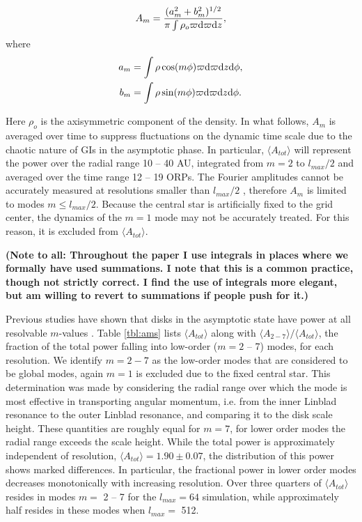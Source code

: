 \documentclass[manuscript]{aastex}
\begin{document}
\begin{equation}
A_m = \frac{(a_m^2 + b_m^2)^{1/2}}{\pi\int\rho_o \varpi {\rm d}\varpi {\rm d}z},
\end{equation}
where
\begin{subequations}
\begin{align}
a_m &= \int \rho \cos(m\phi)\varpi {\rm d}\varpi {\rm d}z {\rm d}\phi,\\
b_m &=\int \rho \sin(m\phi)\varpi {\rm d}\varpi {\rm d}z {\rm d}\phi.
\end{align}
\end{subequations}


Here  $\rho_o$ is the axisymmetric component of the density. In what follows, $A_m$ is averaged over time to suppress fluctuations on the dynamic time scale due to the chaotic nature of GIs in the asymptotic  phase.
In particular, $\langle A_{tot} \rangle$ will represent the power over the radial range 10 -- 40 AU, integrated from $ m = 2$ to $l_{max}/2$ and averaged over the time range 12 -- 19 ORPs. The Fourier amplitudes cannot be accurately measured at resolutions smaller than $l_{max}/2$ \citep{shannon1984}, therefore $A_m$ is limited to modes $m \le l_{max}/2$.  
Because the central star is artificially fixed to the grid center, the dynamics of the $m=1$ mode may not
be accurately treated. For this reason, it is excluded from $\langle A_{tot} \rangle$.

{\bf (Note to all: Throughout the paper I use integrals in places where we 
formally have used summations.  I note that this is a common practice, though
not strictly correct.  I find the use of integrals more elegant, but am willing to
revert to summations if people push for it.)}

Previous studies have shown that disks in the asymptotic state have power at all resolvable $m$-values  \citep{lodato2004,mejia2005,boley2006,cossins2009}.  Table \ref{tbl:ams} lists $\langle A_{tot} \rangle$ along with $\langle A_{2-7} \rangle  /  \langle A_{tot} \rangle$,  the fraction of the total power falling into low-order ($m = 2$ -- 7) modes, for each resolution. We identify $m=2-7$ as the low-order modes that are considered to be global modes, again 
$m=1$ is excluded due to the fixed central star. This determination was made by considering the radial range over 
which the mode is most effective in transporting angular momentum, i.e. from the inner Linblad resonance to the outer 
Linblad resonance, and comparing it to the disk scale height. These quantities are roughly equal for $m=7$, for lower 
order modes the radial range exceeds the scale height.
While the total power is approximately independent of resolution, $\langle A_{tot} \rangle = 1.90 \pm 0.07$, 
the distribution of this power shows marked differences. In particular, the fractional power in lower order modes decreases monotonically with increasing resolution.  Over three quarters of $\langle A_{tot} \rangle$ resides
in modes $m =$ 2 -- 7 for the $l_{max} = 64$ simulation, while approximately half resides in these modes when $l_{max} =$ 512.
\end{document}
